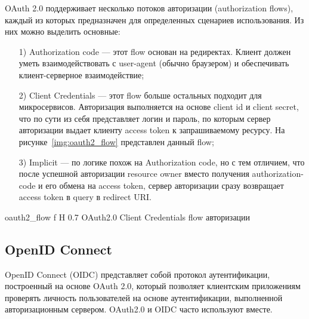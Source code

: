 OAuth 2.0 поддерживает несколько потоков авторизации (authorization flows), каждый из которых предназначен для определенных сценариев использования.
Из них можно выделить основные:
 \begin{enumerate}
  \item[1)] Authorization code --- этот flow основан на редиректах. Клиент должен уметь взаимодействовать с user-agent (обычно браузером) и обеспечивать клиент-серверное взаимодействие;
  \item[2)] Client Credentials --- этот flow больше остальных подходит для микросервисов. Авторизация выполняется на основе client id и client secret, что по сути из себя представляет логин и пароль, по которым сервер авторизации выдает клиенту access token к запрашиваемому ресурсу. На рисунке~\ref{img:oauth2_flow} представлен данный flow;
  \item[3)] Implicit --- по логике похож на Authorization code, но с тем отличием, что после успешной авторизации resource owner вместо получения authorization-code и его обмена на access token, сервер авторизации сразу возвращает access token в query в redirect URI.~\cite{oauth2_spec}
\end{enumerate}

    {oauth2_flow}
    {f}
    {H}
    {0.7\textwidth}
    {OAuth2.0 Client Credentials flow авторизации}




\subsection{OpenID Connect}
OpenID Connect (OIDC) представляет собой протокол аутентификации, построенный на основе OAuth 2.0, который позволяет клиентским приложениям проверять личность пользователей на основе аутентификации, выполненной авторизационным сервером. OAuth2.0 и OIDC часто используют вместе.~\cite{oidc}

